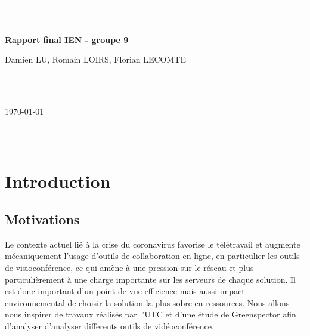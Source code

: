 \documentclass[11pt,a4paper]{report}
\begin{document}
\begin{titlepage}
\vspace*{\fill}
\hrule ~\vspace{0.5cm}

\begin{huge}
\noindent \textbf{Rapport final IEN - groupe 9}
\end{huge} 
\vspace{0.5cm}

\vspace{2cm}

\begin{Large}
\noindent Damien LU, Romain LOIRS, Florian LECOMTE
\end{Large} \\ \\
\begin{Large}
\today
\end{Large}
~\vspace{0.5cm}
\hrule
\vspace*{\fill}
\end{titlepage}

\tableofcontents

\newpage
\chapter*{Introduction}

\section{Motivations}
Le contexte actuel lié à la crise du coronavirus favorise le télétravail et augmente mécaniquement l’usage d’outils de collaboration en ligne, en particulier les outils de visioconférence, ce qui amène à une pression sur le réseau et plus particulièrement à une charge importante sur les serveurs de chaque solution. Il est donc important d’un point de vue efficience mais aussi impact environnemental de choisir la solution la plus sobre en ressources. Nous allons nous inspirer de travaux réalisés par l'UTC et d'une étude de Greenspector afin d'analyser d'analyser differents outils de vidéoconférence.
\end{document}
